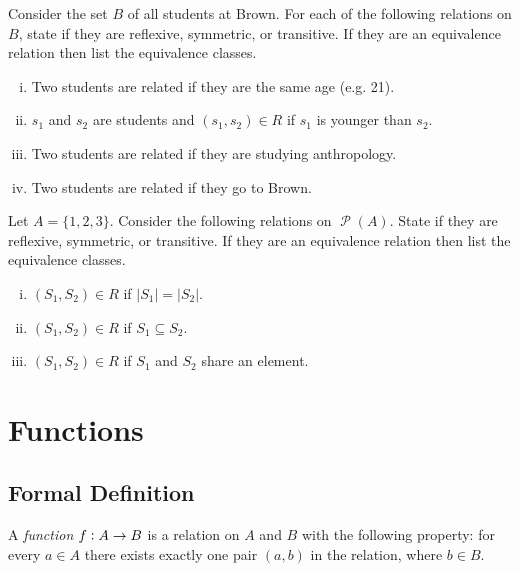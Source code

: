 \documentclass[12pt,letterpaper]{article}
\newcommand\Pow{\ensuremath{\operatorname{\mathcal{P}}}}
\begin{document}
    \begin{mdframed}
    		\item Consider the set $B$ of all students at Brown. For each of the following relations on $B$, state if they are reflexive, symmetric, or transitive. If they are an equivalence relation then list the equivalence classes.

		\begin{enumerate}[i.]
			\item Two students are related if they are the same age (e.g. 21).
			\item$s_1$ and $s_2$ are students and $(s_1,s_2) \in R$ if $s_1$ is younger than $s_2$.

		\item Two students are related if they are studying anthropology.

	  	\item Two students are related if they go to Brown.

		\end{enumerate}

		\item Let $A = \{1,2,3\}$. Consider the following relations on $\Pow{(A)}$. State if they are reflexive, symmetric, or transitive. If they are an equivalence relation then list the equivalence classes.

		\begin{enumerate}[i.]
			\item $(S_1,S_2) \in R$ if $|S_1| = |S_2|$.

			\item $(S_1,S_2) \in R$ if $S_1 \subseteq S_2$.

			\item $(S_1,S_2) \in R$ if $S_1$ and $S_2$ share an element.

		\end{enumerate}

    \end{mdframed}

\section{Functions}

    \subsection{Formal Definition}
    
    A \textit{function} $f \vcentcolon A \rightarrow B$ is a relation on $A$ and $B$ with the following property: for every $a \in A$ there exists exactly one pair $(a,b)$ in the relation, where $b \in B$.
    
\end{document}
